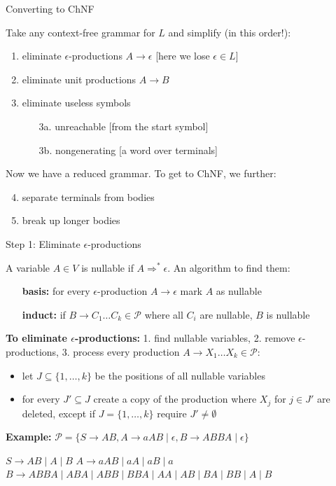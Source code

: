 \documentclass[handout]{beamer}
\begin{document}
\begin{frame}{Converting to ChNF}

	Take any context-free grammar for $L$ and simplify (\alert{in this order!}):
	
	\begin{enumerate}
		\item eliminate \alert{$\epsilon$-productions} $A\rightarrow\epsilon$
		\hfill{\small [here we lose $\epsilon\in L$]}
		\item eliminate \alert{unit productions} $A\rightarrow B$
		\item eliminate \alert{useless} symbols
		\begin{itemize}
			\item[3a.] \alert{unreachable} \hfill[from the start symbol]
			\item[3b.] \alert{nongenerating} \hfill[a word over terminals]
		\end{itemize} 
	\end{enumerate}

	Now we have a \alert{reduced} grammar. To get to ChNF, we further:
		
	\begin{enumerate}\setcounter{enumi}{3}
		\item \alert{separate} terminals from bodies
		\item \alert{break up} longer bodies
	\end{enumerate}

\end{frame}


\begin{frame}{Step 1: Eliminate $\epsilon$-productions}

	A variable $A\in V$ is \alert{nullable} if $A\Rightarrow^* \epsilon$. An algorithm to find them:
	\begin{itemize}
		\item[\textbf{basis:}] for every $\epsilon$-production $A\rightarrow \epsilon$ mark $A$ as nullable
		\item[\textbf{induct:}] if $B\rightarrow C_1 \ldots C_k\in\mathcal P$ where all $C_i$ are nullable, $B$ is nullable
	\end{itemize}

	\textbf{To eliminate $\epsilon$-productions:} 1. find nullable variables, 2. remove $\epsilon$-productions, 3. process every production $A\rightarrow X_1\ldots X_k \in \mathcal P$:
	\begin{itemize}
		\item let $J\subseteq\{1,\dots,k\}$ be the positions of all nullable variables
		\item for every $J'\subseteq J$ create a copy of the production where $X_j$ for $j\in J'$ are deleted, except if $J=\{1,\dots,k\}$ require $J'\neq\emptyset$
	\end{itemize}

	\textbf{Example:} $\mathcal P=\{S\rightarrow AB,A\rightarrow aAB\mid\epsilon,B\rightarrow ABBA\mid\epsilon\}$

	$S\rightarrow AB\mid A\mid B$
	$A\rightarrow aAB\mid aA\mid aB\mid a$
	$B\rightarrow ABBA\mid ABA\mid ABB\mid BBA\mid AA\mid AB\mid BA\mid BB\mid A\mid B$

\end{frame}
\end{document}
